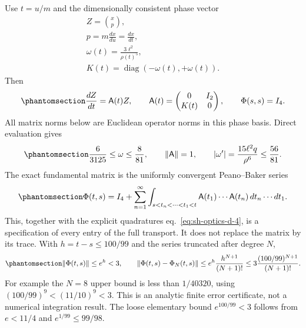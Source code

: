 \documentclass[
  english,
  11pt,
  reqno]{amsart}
\begin{document}
Use \(t=u/m\) and the dimensionally consistent phase vector \[
 \begin{gathered}
Z=\binom{x}{p}, \\
p=m\frac{dx}{du}=\frac{dx}{dt}, \\
\omega(t)=\frac{3\ell^2}{\rho(t)^5}, \\
K(t)=\operatorname{diag}(-\omega(t),+\omega(t)).
\end{gathered}
\] Then
\begin{equation}\protect\phantomsection\label{eq:sh-optics-d-12}{
 \frac{dZ}{dt}=\mathsf A(t)Z,\qquad
 \mathsf A(t)=\begin{pmatrix}0&I_2\\K(t)&0\end{pmatrix},
 \qquad\Phi(s,s)=I_4.
}\end{equation} All matrix norms below are Euclidean operator norms in
this phase basis. Direct evaluation gives
\begin{equation}\protect\phantomsection\label{eq:sh-optics-d-13}{
 \frac6{3125}\le\omega\le\frac8{81},\qquad
 \|\mathsf A\|=1,\qquad
 |\omega'|=\frac{15\ell^2q}{\rho^6}\le\frac{56}{81}.
}\end{equation} The exact fundamental matrix is the uniformly convergent
Peano--Baker series
\begin{equation}\protect\phantomsection\label{eq:sh-optics-d-14}{
 \Phi(t,s)=I_4+
 \sum_{n=1}^\infty
 \int_{s<t_n<\cdots<t_1<t}
 \mathsf A(t_1)\cdots\mathsf A(t_n)\,dt_n\cdots dt_1.
}\end{equation} This, together with the explicit quadratures
eq.~\ref{eq:sh-optics-d-4}, is a specification of every entry of the
full transport. It does not replace the matrix by its trace. With
\(h=t-s\le100/99\) and the series truncated after degree \(N\),
\begin{equation}\protect\phantomsection\label{eq:sh-optics-d-15}{
 \|\Phi(t,s)\|\le e^h<3,\qquad
 \|\Phi(t,s)-\Phi_N(t,s)\|
 \le e^h\frac{h^{N+1}}{(N+1)!}
 \le3\frac{(100/99)^{N+1}}{(N+1)!}.
}\end{equation} For example the \(N=8\) upper bound is less than
\(1/40320\), using \((100/99)^9<(11/10)^9<3\). This is an analytic
finite error certificate, not a numerical integration result. The loose
elementary bound \(e^{100/99}<3\) follows from \(e<11/4\) and
\(e^{1/99}\le99/98\).
\end{document}
